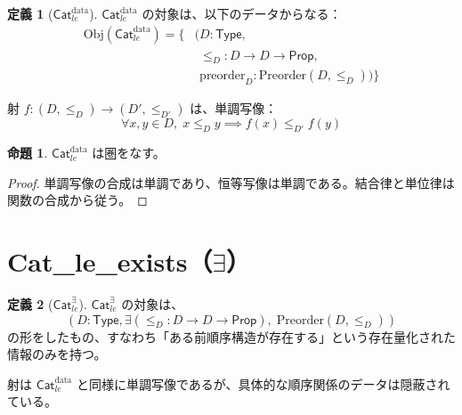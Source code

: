 \documentclass[a4paper,12pt]{ltjsarticle}
\theoremstyle{definition}
\newtheorem{definition}{定義}[section]
\newtheorem{proposition}{命題}[section]
\begin{document}
\begin{definition}[$\mathsf{Cat}_{le}^{\text{data}}$]
$\mathsf{Cat}_{le}^{\text{data}}$ の対象は、以下のデータからなる：
\begin{align*}
  \text{Obj}(\mathsf{Cat}_{le}^{\text{data}}) = \{
    &(D : \mathsf{Type}, \\
    &\phantom{(} \le_D : D \to D \to \mathsf{Prop}, \\
    &\phantom{(} \text{preorder}_D : \text{Preorder}(D, \le_D)) \}
\end{align*}

射 $f : (D, \le_D) \to (D', \le_{D'})$ は、単調写像：
\[
  \forall x, y \in D,\; x \le_D y \implies f(x) \le_{D'} f(y)
\]
\end{definition}

\begin{center}
\end{center}

\begin{proposition}
$\mathsf{Cat}_{le}^{\text{data}}$ は圏をなす。
\end{proposition}

\begin{proof}
単調写像の合成は単調であり、恒等写像は単調である。結合律と単位律は関数の合成から従う。
\end{proof}


\section{Cat\_le\_exists（$\exists$）}

\begin{definition}[$\mathsf{Cat}_{le}^{\exists}$]
$\mathsf{Cat}_{le}^{\exists}$ の対象は、
\[
  (D : \mathsf{Type}, \exists (\le_D : D \to D \to \mathsf{Prop}),\; \text{Preorder}(D, \le_D))
\]
の形をしたもの、すなわち「ある前順序構造が存在する」という存在量化された情報のみを持つ。

射は $\mathsf{Cat}_{le}^{\text{data}}$ と同様に単調写像であるが、具体的な順序関係のデータは隠蔽されている。
\end{definition}
\end{document}
